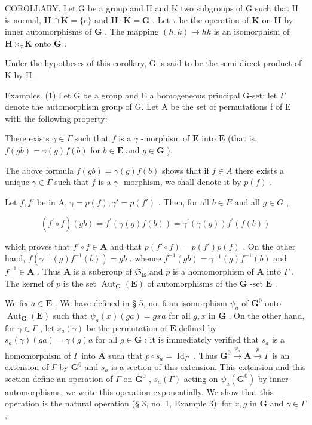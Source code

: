 COROLLARY. Let G be a group and H and K two subgroups of G such that H is normal, \(\mathbf{H} \cap \mathbf{K} = \{e\}\) and \(\mathbf{H} \cdot \mathbf{K} = \mathbf{G}\) . Let \(\tau\) be the operation of \(\mathbf{K}\) on \(\mathbf{H}\) by inner automorphisms of \(\mathbf{G}\) . The mapping \((h, k) \mapsto hk\) is an isomorphism of \(\mathbf{H} \times_{\tau} \mathbf{K}\) onto \(\mathbf{G}\) .

Under the hypotheses of this corollary, G is said to be the semi-direct product of K by H.

Examples. (1) Let G be a group and E a homogeneous principal G-set; let \(\Gamma\) denote the automorphism group of G. Let A be the set of permutations f of E with the following property:

There exists \(\gamma \in \Gamma\) such that \(f\) is a \(\gamma\) -morphism of \(\mathbf{E}\) into \(\mathbf{E}\) (that is, \(f(gb) = \gamma(g)f(b)\) for \(b \in \mathbf{E}\) and \(g \in \mathbf{G}\) ).

The above formula \(f(gb) = \gamma(g)f(b)\) shows that if \(f \in A\) there exists a unique \(\gamma \in \Gamma\) such that \(f\) is a \(\gamma\) -morphism, we shall denote it by \(p(f)\) .

Let \(f, f'\) be in A, \(\gamma = p(f), \gamma' = p(f')\) . Then, for all \(b \in E\) and all \(g \in G\) ,

\[
(f ^ {\prime} \circ f) (g b) = f ^ {\prime} (\gamma (g) f (b)) = \gamma^ {\prime} (\gamma (g)) f ^ {\prime} (f (b))
\]

which proves that \(f' \circ f \in \mathbf{A}\) and that \(p(f' \circ f) = p(f')p(f)\) . On the other hand, \(f(\gamma^{-1}(g)f^{-1}(b)) = gb\) , whence \(f^{-1}(gb) = \gamma^{-1}(g)f^{-1}(b)\) and \(f^{-1} \in \mathbf{A}\) . Thus \(\mathbf{A}\) is a subgroup of \(\mathfrak{S}_{\mathbf{E}}\) and \(p\) is a homomorphism of \(\mathbf{A}\) into \(\Gamma\) . The kernel of \(p\) is the set \(\operatorname{Aut}_{\mathbf{G}}(\mathbf{E})\) of automorphisms of the \(\mathbf{G}\) -set \(\mathbf{E}\) .

We fix \(a \in \mathbf{E}\) . We have defined in § 5, no. 6 an isomorphism \(\psi_a\) of \(\mathbf{G}^0\) onto \(\operatorname{Aut}_{\mathbf{G}}(\mathbf{E})\) such that \(\psi_a(x)(ga) = gxa\) for all \(g, x\) in \(\mathbf{G}\) . On the other hand, for \(\gamma \in \Gamma\) , let \(s_a(\gamma)\) be the permutation of \(\mathbf{E}\) defined by \(s_a(\gamma)(ga) = \gamma(g)a\) for all \(g \in \mathbf{G}\) ; it is immediately verified that \(s_a\) is a homomorphism of \(\Gamma\) into \(\mathbf{A}\) such that \(p \circ s_a = \operatorname{Id}_{\Gamma}\) . Thus \(\mathbf{G}^0 \xrightarrow{\psi_a} \mathbf{A} \xrightarrow{p} \Gamma\) is an extension of \(\Gamma\) by \(\mathbf{G}^0\) and \(s_a\) is a section of this extension. This extension and this section define an operation of \(\Gamma\) on \(\mathbf{G}^0\) , \(s_a(\Gamma)\) acting on \(\psi_a(\mathbf{G}^0)\) by inner automorphisms; we write this operation exponentially. We show that this operation is the natural operation (§ 3, no. 1, Example 3): for \(x, g\) in \(\mathbf{G}\) and \(\gamma \in \Gamma\) ,

